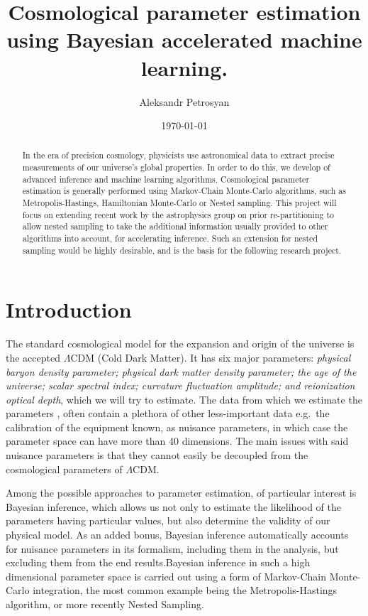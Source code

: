 \documentclass[11pt, reprint]{revtex4-2}
\begin{document}
\title{Cosmological parameter estimation using Bayesian accelerated machine learning.}
\author{Aleksandr Petrosyan}
\noaffiliation
\date{\today}
\renewcommand*{\bibfont}{\small}


\begin{abstract}In the era of precision cosmology, physicists use
  astronomical data to extract precise measurements of our universe's
  global properties. In order to do this, we develop of advanced
  inference and machine learning algorithms.  Cosmological parameter
  estimation is generally performed using Markov-Chain Monte-Carlo
  algorithms, such as Metropolis-Hastings, Hamiltonian Monte-Carlo or
  Nested sampling. This project will focus on extending recent work by
  the astrophysics group on prior re-partitioning to allow nested
  sampling to take the additional information usually provided to
  other algorithms into account, for accelerating inference. Such an
  extension for nested sampling would be highly desirable, and is the
  basis for the following research project.
\end{abstract}

\maketitle

\vspace{0.9in}
\section{Introduction}\label{sec:introduction}

The standard cosmological model for the expansion and origin of the
universe is the accepted $\Lambda$CDM\cite{Condon2018} (Cold Dark
Matter). It has six major parameters: \emph{physical baryon density
  parameter; physical dark matter density parameter; the age of the
  universe; scalar spectral index; curvature fluctuation amplitude;
  and reionization optical depth}, which we will try to estimate. The
data from which we estimate the parameters \cite[See. ]{planck},
often contain a plethora of other less-important data e.g.~the
calibration of the equipment known, as nuisance parameters, in which
case the parameter space can have more than 40 dimensions. The main
issues with said nuisance parameters is that they cannot easily be
decoupled from the cosmological parameters of $\Lambda$CDM.

Among the possible approaches to parameter estimation, of particular
interest is Bayesian inference, which allows us not only to estimate
the likelihood of the parameters having particular values, but also
determine the validity of our physical model. As an added bonus,
Bayesian inference automatically accounts for nuisance parameters in
its formalism, including them in the analysis, but excluding them from
the end results.Bayesian inference in such a high dimensional
parameter space is carried out using a form of Markov-Chain
Monte-Carlo integration, the most common example being the
Metropolis-Hastings algorithm\cite{Metropolis}, or more recently
Nested Sampling\cite{polychord,skilling2006}.
\end{document}
